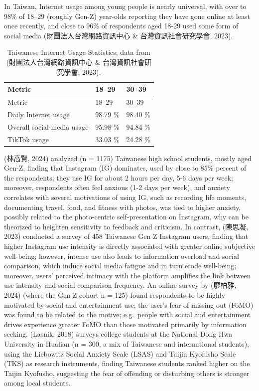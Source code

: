 \documentclass[
  12pt,
  letterpaper,
  DIV=11,
  numbers=noendperiod]{scrartcl}
\begin{document}
In Taiwan, Internet usage among young people is nearly universal, with
over to 98\% of 18--29 (roughly Gen-Z) year‐olds reporting they have
gone online at least once recently, and close to 96\% of respondents
aged 18-29 used some form of social media (財團法人台灣網路資訊中心 \&
台灣資訊社會研究學會, 2023).

\def\pandoctableshortcapt{Taiwanese Internet Usage Statistics}

\begin{longtable}[]{@{}lll@{}}
\caption[Taiwanese Internet Usage Statistics]{Taiwanese Internet Usage
Statistics; data from (財團法人台灣網路資訊中心 \& 台灣資訊社會研究學會,
2023).}\tabularnewline
\toprule\noalign{}
Metric & 18--29 & 30--39 \\
\midrule\noalign{}
\endfirsthead
\toprule\noalign{}
Metric & 18--29 & 30--39 \\
\midrule\noalign{}
\endhead
\bottomrule\noalign{}
\endlastfoot
Daily Internet usage & 98.79 \% & 98.40 \% \\
Overall social-media usage & 95.98 \% & 94.84 \% \\
TikTok usage & 33.03 \% & 24.28 \% \\
\end{longtable}

\let\pandoctableshortcapt\relax

(林高賢, 2024) analyzed (n = 1175) Taiwanese high school students,
mostly aged Gen-Z, finding that Instagram (IG) dominates, used by close
to 85\% percent of the respondents; they use IG for about 2 hours per
day, 5-6 days per week; moreover, respondents often feel anxious (1-2
days per week), and anxiety correlates with several motivations of using
IG, such as recording life moments, documenting travel, food, and
fitness with photos, was tied to higher anxiety, possibly related to the
photo-centric self-presentation on Instagram, why can be theorized to
heighten sensitivity to feedback and criticism. In contrast, (陳思凝,
2023) conducted a survey of 458 Taiwanese Gen Z Instagram users, finding
that higher Instagram use intensity is directly associated with greater
online subjective well-being; however, intense use also leads to
information overload and social comparison, which induce social media
fatigue and in turn erode well-being; moreover, users' perceived
intimacy with the platform amplifies the link between use intensity and
social comparison frequency. An online survey by (廖柏雅, 2024) (where
the Gen-Z cohort n = 125) found respondents to be highly motivated by
social and entertainment use; the user's fear of missing out (FoMO) was
found to be related to the motive; e.g.~people with social and
entertainment drives experience greater FoMO than those motivated
primarily by information seeking. (Lasnik, 2018) surveys college
students at the National Dong Hwa University in Hualian (n = 300, a mix
of Taiwanese and international students), using the Liebowitz Social
Anxiety Scale (LSAS) and Taijin Kyofusho Scale (TKS) as research
instruments, finding Taiwanese students ranked higher on the Taijin
Kyofusho, suggesting the fear of offending or disturbing others is
stronger among local students.
\end{document}
